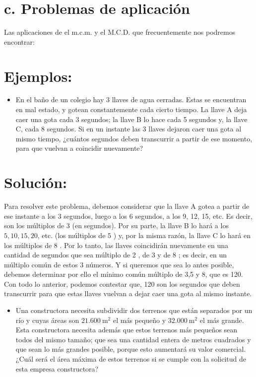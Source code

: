 \documentclass[10pt]{article}
\begin{document}
\section*{c. Problemas de aplicación}
Las aplicaciones de el m.c.m. y el M.C.D. que frecuentemente nos podremos encontrar:

\section*{Ejemplos:}
\begin{itemize}
  \item En el baño de un colegio hay 3 llaves de agua cerradas. Estas se encuentran en mal estado, y gotean constantemente cada cierto tiempo. La llave A deja caer una gota cada 3 segundos; la llave B lo hace cada 5 segundos y, la llave C, cada 8 segundos. Si en un instante las 3 llaves dejaron caer una gota al mismo tiempo, ¿cuántos segundos deben transcurrir a partir de ese momento, para que vuelvan a coincidir nuevamente?
\end{itemize}

\section*{Solución:}
Para resolver este problema, debemos considerar que la llave A gotea a partir de ese instante a los 3 segundos, luego a los 6 segundos, a los 9, 12, 15, etc. Es decir, son los múltiplos de 3 (en segundos). Por su parte, la llave B lo hará a los $5,10,15,20$, etc. (los múltiplos de 5 ) y, por la misma razón, la llave C lo hará en los múltiplos de 8 . Por lo tanto, las llaves coincidirán nuevamente en una cantidad de segundos que sea múltiplo de 2 , de 3 y de 8 ; es decir, en un múltiplo común de estos 3 números. Y si queremos que sea lo antes posible, debemos determinar por ello el mínimo común múltiplo de 3,5 y 8, que es 120.\\
Con todo lo anterior, podemos contestar que, 120 son los segundos que deben transcurrir para que estas llaves vuelvan a dejar caer una gota al mismo instante.

\begin{itemize}
  \item Una constructora necesita subdividir dos terrenos que están separados por un río y cuyas áreas son $21.600 \mathrm{~m}^{2}$ el más pequeño y $32.000 \mathrm{~m}^{2}$ el más grande. Esta constructora necesita además que estos terrenos más pequeños sean todos del mismo tamaño; que sea una cantidad entera de metros cuadrados y que sean lo más grandes posible, porque esto aumentará su valor comercial. ¿Cuál será el área máxima de estos terrenos si se cumple con la solicitud de esta empresa constructora?
\end{itemize}
\end{document}
